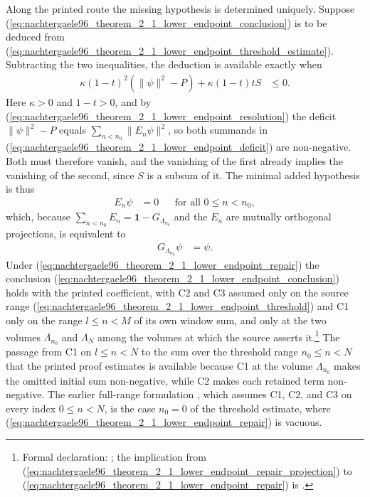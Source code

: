 \documentclass{article}
\begin{document}
Along the printed route the missing hypothesis is determined uniquely.
Suppose (\ref{eq:nachtergaele96_theorem_2_1_lower_endpoint_conclusion}) is to
be deduced from
(\ref{eq:nachtergaele96_theorem_2_1_lower_endpoint_threshold_estimate}).
Subtracting the two inequalities, the deduction is available exactly when
\begin{align}
    \kappa\left(1-t\right)^2
    \left(\lVert\psi\rVert^2-P\right)
    +\kappa\left(1-t\right)tS
        &\leq0.
    \label{eq:nachtergaele96_theorem_2_1_lower_endpoint_deficit}
\end{align}
Here $\kappa>0$ and $1-t>0$, and by
(\ref{eq:nachtergaele96_theorem_2_1_lower_endpoint_resolution}) the deficit
$\lVert\psi\rVert^2-P$ equals $\sum_{n<n_0}\lVert E_n\psi\rVert^2$, so both
summands in
(\ref{eq:nachtergaele96_theorem_2_1_lower_endpoint_deficit}) are
non-negative. Both must therefore vanish, and the vanishing of the first
already implies the vanishing of the second, since $S$ is a subsum of it.
The minimal added hypothesis is thus
\begin{align}
    E_n\psi
        &=0
        &&\text{for all }0\leq n<n_0,
    \label{eq:nachtergaele96_theorem_2_1_lower_endpoint_repair}
\end{align}
which, because $\sum_{n<n_0}E_n=\mathbf 1-G_{\Lambda_{n_0}}$ and the $E_n$ are
mutually orthogonal projections, is equivalent to
\begin{align}
    G_{\Lambda_{n_0}}\psi
        &=\psi.
    \label{eq:nachtergaele96_theorem_2_1_lower_endpoint_repair_projection}
\end{align}
Under (\ref{eq:nachtergaele96_theorem_2_1_lower_endpoint_repair}) the
conclusion (\ref{eq:nachtergaele96_theorem_2_1_lower_endpoint_conclusion})
holds with the printed coefficient, with C2 and C3 assumed only on the source
range (\ref{eq:nachtergaele96_theorem_2_1_lower_endpoint_threshold}) and C1
only on the range $l\leq n<M$ of its own window sum, and only at the two
volumes $\Lambda_{n_0}$ and $\Lambda_N$ among the volumes at which the source
asserts it.\footnote{Formal
    declaration:
    ;
    the implication from
    (\ref{eq:nachtergaele96_theorem_2_1_lower_endpoint_repair_projection}) to
    (\ref{eq:nachtergaele96_theorem_2_1_lower_endpoint_repair}) is
    .}
The passage from C1 on $l\leq n<N$ to the sum over the threshold range
$n_0\leq n<N$ that the printed proof estimates is available because C1 at the
volume $\Lambda_{n_0}$ makes the omitted initial sum non-negative, while C2
makes each retained term non-negative. The earlier full-range formulation
,
which assumes C1, C2, and C3 on every index $0\leq n<N$, is the case
$n_0=0$ of the threshold estimate, where
(\ref{eq:nachtergaele96_theorem_2_1_lower_endpoint_repair}) is vacuous.
\end{document}
